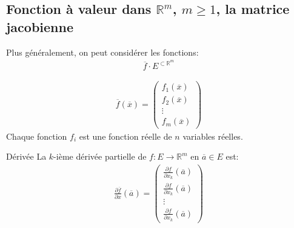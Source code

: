 \subsection{Fonction à valeur dans $ \mathbb{R}^m$, $m \geq 1$, la matrice jacobienne}
\begin{definition}
    Plus généralement, on peut considérer les fonctions:
    \begin{align*}
        \overline{f} \cdot E^{ \subset \mathbb{R}^m}
    \end{align*}
    
    \begin{align*}
        \overline{f}( \overline{x}) = \begin{pmatrix}
            f_1( \overline{x}) \\
            f_2( \overline{x})\\
            \vdots \\
            f_m( \overline{x})
        \end{pmatrix}
    \end{align*}
    Chaque fonction $f_i$ est une fonction réelle de $n$ variables réelles.
\end{definition}

\begin{parag}{Dérivée}
    La $k$-ième dérivée partielle de $f: E \to \mathbb{R}^m$ en $ \overline{a} \in E$ est:
    \begin{align*}
        \frac{\partial \overline{f}}{\partial x}( \overline{a}) = \begin{pmatrix} \frac{\partial f}{\partial x_k}( \overline{a})       \\
            \frac{\partial f}{\partial x_k}( \overline{a})\\
            \vdots\\
            \frac{\partial f}{\partial x_k}( \overline{a})
        \end{pmatrix}
    \end{align*}
    

\end{parag}

